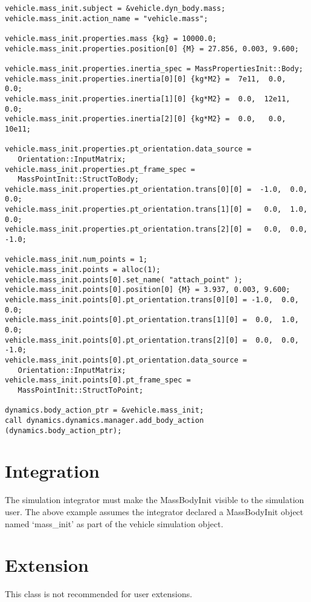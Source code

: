\begin{verbatim}
vehicle.mass_init.subject = &vehicle.dyn_body.mass;
vehicle.mass_init.action_name = "vehicle.mass";

vehicle.mass_init.properties.mass {kg} = 10000.0;
vehicle.mass_init.properties.position[0] {M} = 27.856, 0.003, 9.600;

vehicle.mass_init.properties.inertia_spec = MassPropertiesInit::Body;
vehicle.mass_init.properties.inertia[0][0] {kg*M2} =  7e11,  0.0,   0.0;
vehicle.mass_init.properties.inertia[1][0] {kg*M2} =  0.0,  12e11,  0.0;
vehicle.mass_init.properties.inertia[2][0] {kg*M2} =  0.0,   0.0,  10e11;

vehicle.mass_init.properties.pt_orientation.data_source =
   Orientation::InputMatrix;
vehicle.mass_init.properties.pt_frame_spec =
   MassPointInit::StructToBody;
vehicle.mass_init.properties.pt_orientation.trans[0][0] =  -1.0,  0.0,  0.0;
vehicle.mass_init.properties.pt_orientation.trans[1][0] =   0.0,  1.0,  0.0;
vehicle.mass_init.properties.pt_orientation.trans[2][0] =   0.0,  0.0, -1.0;

vehicle.mass_init.num_points = 1;
vehicle.mass_init.points = alloc(1);
vehicle.mass_init.points[0].set_name( "attach_point" );
vehicle.mass_init.points[0].position[0] {M} = 3.937, 0.003, 9.600;
vehicle.mass_init.points[0].pt_orientation.trans[0][0] = -1.0,  0.0,  0.0;
vehicle.mass_init.points[0].pt_orientation.trans[1][0] =  0.0,  1.0,  0.0;
vehicle.mass_init.points[0].pt_orientation.trans[2][0] =  0.0,  0.0, -1.0;
vehicle.mass_init.points[0].pt_orientation.data_source =
   Orientation::InputMatrix;
vehicle.mass_init.points[0].pt_frame_spec =
   MassPointInit::StructToPoint;

dynamics.body_action_ptr = &vehicle.mass_init;
call dynamics.dynamics.manager.add_body_action (dynamics.body_action_ptr);
\end{verbatim}


\section{Integration}
The simulation integrator must make the MassBodyInit visible to
the simulation user. The above example assumes the integrator declared
a MassBodyInit object named `mass\_init' as part of the vehicle
simulation object.

\section{Extension}
This class is not recommended for user extensions.
